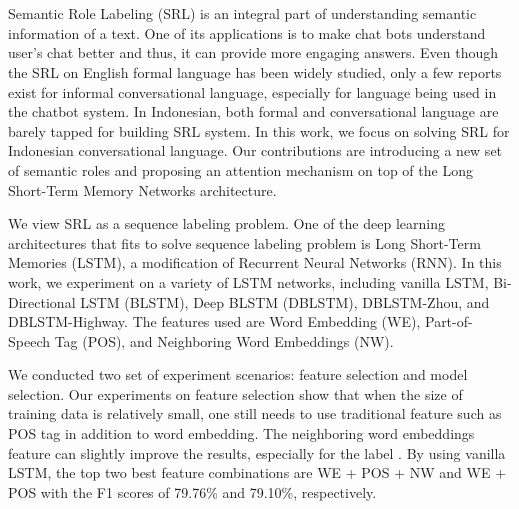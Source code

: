 \chapter{\babEnam}

Semantic Role Labeling (SRL) is an integral part of understanding semantic information of a text. One of its applications is to make chat bots understand user's chat better and thus, it can provide more engaging answers. Even though the SRL on English formal language has been widely studied, only a few reports exist for informal conversational language, especially for language being used in the chatbot system. In Indonesian, both formal and conversational language are barely tapped for building SRL system. In this work, we focus on solving SRL for Indonesian conversational language. Our contributions are introducing a new set of semantic roles and proposing an attention mechanism on top of the Long Short-Term Memory Networks architecture. 

We view SRL as a sequence labeling problem. One of the deep learning architectures that fits to solve sequence labeling problem is Long Short-Term Memories (LSTM), a modification of Recurrent Neural Networks (RNN). In this work, we experiment on a variety of LSTM networks, including vanilla LSTM, Bi-Directional LSTM (BLSTM), Deep BLSTM (DBLSTM), DBLSTM-Zhou, and DBLSTM-Highway. The features used are Word Embedding (WE), Part-of-Speech Tag (POS), and Neighboring Word Embeddings (NW).

We conducted two set of experiment scenarios: feature selection and model selection. Our experiments on feature selection show that when the size of training data is relatively small, one still needs to use traditional feature such as POS tag in addition to word embedding. The neighboring word embeddings feature can slightly improve the results, especially for the label \greet. By using vanilla LSTM, the top two best feature combinations are WE + POS + NW and WE + POS with the F1 scores of 79.76\% and 79.10\%, respectively.

